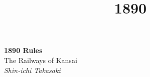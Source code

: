 \documentclass{article}
\title{1890}
\begin{document}
\begin{titlepage}
  \begin{center}
    \Huge\textbf{1890 Rules}\\
    \Large{The Railways of Kansai}\\
    \large\textit{Shin-ichi Takasaki}
  \end{center}
\end{titlepage}

\begin{multicols}{2}
\tableofcontents
\end{multicols}
\pagebreak
{}
\end{document}
